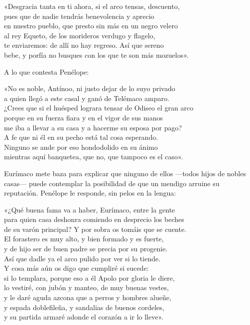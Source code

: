 \begin{versocita}
«Desgracia tanta en ti ahora, si el arco tensas, descuento,\\
pues que de nadie tendrás benevolencia y aprecio\\
en nuestro pueblo, que presto sin más en un negro velero\\
al rey Equeto, de los morideros verdugo y flagelo,\\
te enviaremos: de allí no hay regreso. Así que sereno\\
bebe, y porfía no busques con los que te son más mozuelos».
\end{versocita}

A lo que contesta Penélope:

\begin{versocita}
«No es noble, Antínoo, ni justo dejar de lo suyo privado\\
a quien llegó a este casal y ganó de Telémaco amparo.\\
¿Crees que si el huésped lograra tensar de Odiseo el gran arco\\
porque en su fuerza fiara y en el vigor de sus manos\\
me iba a llevar a su casa y a hacerme su esposa por pago?\\
A fe que ni él en su pecho está tal cosa esperando.\\
Ninguno se ande por eso hondodolido en su ánimo\\
mientras aquí banquetea, que no, que tampoco es el caso».
\end{versocita}

Eurímaco mete baza para explicar que ninguno de ellos ---todos hijos de nobles casas--- puede contemplar la posibilidad de que un mendigo arruine su reputación. Penélope le responde, sin pelos en la lengua:

\begin{versocita}
«¿Qué buena fama va a haber, Eurímaco, entre la gente\\
para quien casa deshonra comiendo en desprecio los beches\\
de su varón principal? Y por sobra os tomáis que se cuente.\\
El forastero es muy alto, y bien formado y es fuerte,\\
y de hijo ser de buen padre se precia por su progenie.\\
Así que dadle ya el arco pulido por ver si lo tiende.\\
Y cosa más aún os digo que cumpliré si sucede:\\
si lo templara, porque eso a él Apolo por gloria le diere,\\
lo vestiré, con jubón y manteo, de muy buenas vestes,\\
y le daré aguda azcona que a perros y hombres alueñe,\\
y espada doblefileña, y sandalias de buenos cordeles,\\
y su partida armaré adonde el corazón a ir lo lleve».
\end{versocita}

